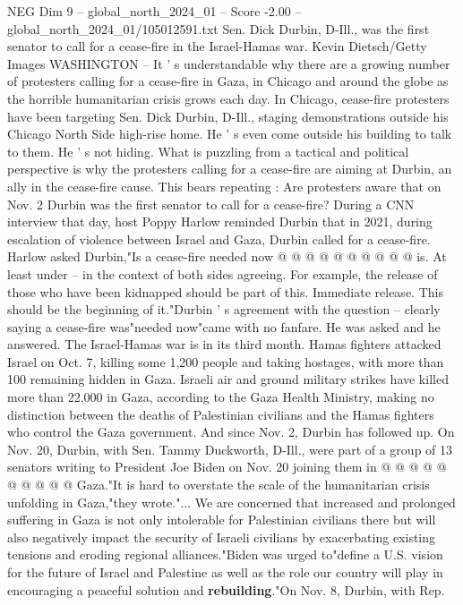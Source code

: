 \begin{textsample}{NEG Dim 9 – global\_north\_2024\_01 – Score -2.00 – global\_north\_2024\_01/105012591.txt}  \label{ex:f9_neg_190}
Sen.
Dick Durbin, D-Ill., was the first senator to call for a cease-fire in the Israel-Hamas war.
Kevin Dietsch/Getty Images WASHINGTON -- It ' s understandable why there are a growing number of protesters calling for a cease-fire in Gaza, in Chicago and around the globe as the horrible humanitarian crisis grows each day.
In Chicago, cease-fire protesters have been targeting Sen.
Dick Durbin, D-Ill., staging demonstrations outside his Chicago North Side high-rise home.
He ' s even come outside his building to talk to them.
He ' s not hiding.
What is puzzling from a tactical and political perspective is why the protesters calling for a cease-fire are aiming at Durbin, an ally in the cease-fire cause.
This bears repeating : Are protesters aware that on Nov. 2 Durbin was the first senator to call for a cease-fire?
During a CNN interview that day, host Poppy Harlow reminded Durbin that in 2021, during escalation of violence between Israel and Gaza, Durbin called for a cease-fire.
Harlow asked Durbin,"Is a cease-fire needed now @ @ @ @ @ @ @ @ @ @ is.
At least under -- in the context of both sides agreeing.
For example, the release of those who have been kidnapped should be part of this.
Immediate release.
This should be the beginning of it."Durbin ' s agreement with the question -- clearly saying a cease-fire was"needed now"came with no fanfare.
He was asked and he answered.
The Israel-Hamas war is in its third month.
Hamas fighters attacked Israel on Oct. 7, killing some 1,200 people and taking hostages, with more than 100 remaining hidden in Gaza.
Israeli air and ground military strikes have killed more than 22,000 in Gaza, according to the Gaza Health Ministry, making no distinction between the deaths of Palestinian civilians and the Hamas fighters who control the Gaza government.
And since Nov. 2, Durbin has followed up.
On Nov. 20, Durbin, with Sen.
Tammy Duckworth, D-Ill., were part of a group of 13 senators writing to President Joe Biden on Nov. 20 joining them in @ @ @ @ @ @ @ @ @ @ Gaza."It is hard to overstate the scale of the humanitarian crisis unfolding in Gaza,"they wrote."...
We are concerned that increased and prolonged suffering in Gaza is not only intolerable for Palestinian civilians there but will also negatively impact the security of Israeli civilians by exacerbating existing tensions and eroding regional alliances."Biden was urged to"define a U.S. vision for the future of Israel and Palestine as well as the role our country will play in encouraging a peaceful solution and \textbf{rebuilding}."On Nov. 8, Durbin, with Rep.

\end{textsample}
